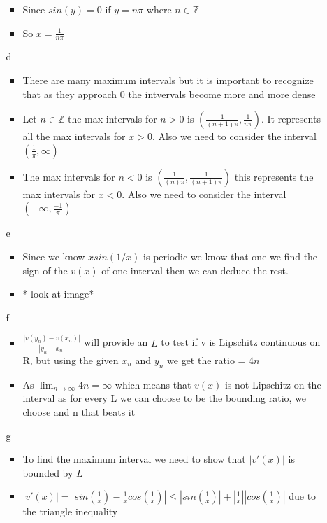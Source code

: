 \documentclass{article}
\begin{document}
\begin{enumerate}
\begin{enumerate}
\begin{itemize}
            \item Since $sin(y) = 0$ if $y = n\pi$ where $n \in \mathbb{Z} $
            \item So $ x = \frac{1}{n\pi}$
        \end{itemize}
        \item [d] \begin{itemize}
            \item There are many maximum intervals but it is important to recognize that as they approach 0 the intvervals become more and more dense
            \item Let $n \in \mathbb{Z} $ the max intervals for $n>0$ is $(\frac{1}{(n+1)\pi}, \frac{1}{n\pi}) $. It represents all the max intervals for $x>0$. Also we need to consider the interval $(\frac{1}{\pi},\infty) $
            \item The max intervals for $n<0$ is $(\frac{1}{(n)\pi}, \frac{1}{(n+1)\pi}) $ this represents the max intervals for $x<0$. Also we need to consider the interval $(-\infty,\frac{-1}{\pi})$
        \end{itemize}
        \item [e] \begin{itemize}
            \item Since we know $xsin(1/x)$ is periodic we know that one we find the sign of the $v(x)$ of one interval then we can deduce the rest.
            \item * look at image*
        \end{itemize}
        \item [f] \begin{itemize}
            \item $\frac{|v(y_n) - v(x_n)|}{|y_n - x_n|}$ will provide an $ L$ to test if v is Lipschitz continuous on R, but using the given $x_n$ and $y_n$ we get the ratio = $4n$ 
            \item As $\lim_{n \rightarrow \infty} 4n = \infty$ which means that $v(x)$ is not Lipschitz on the interval as for every L we can choose to be the bounding ratio, we choose and n that beats it
        \end{itemize}
        \item [g]\begin{itemize}
            \item To find the maximum interval we need to show that $|v'(x)|$ is bounded by $L$ 
            \item $|v'(x)| = |sin(\frac{1}{x}) - \frac{1}{x}cos(\frac{1}{x})|\leq |sin(\frac{1}{x})| + |\frac{1}{x}||cos(\frac{1}{x})| $ due to the triangle inequality

\end{itemize}
\end{enumerate}
\end{enumerate}
\end{document}
